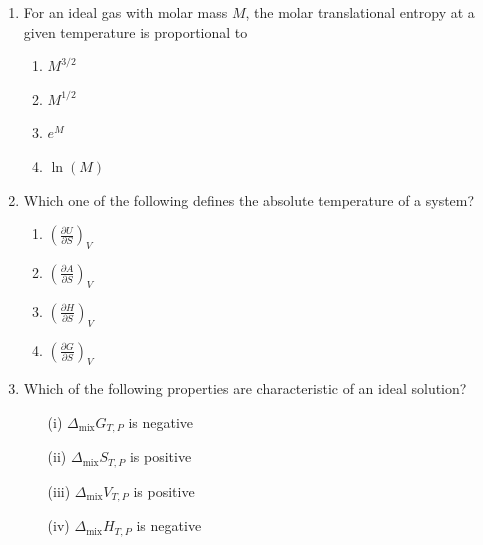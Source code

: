 \documentclass[journal,12pt,onecolumn]{exam}
\theoremstyle{remark}
\begin{document}
\begin{enumerate}
 

\item 

For an ideal gas with molar mass $M$, the molar translational entropy at a given temperature is proportional to

\hfill{}

 

\begin{multicols}{2}
\begin{enumerate}
    \item \textcolor{red}{} $M^{3/2}$
    \item \textcolor{red}{} $M^{1/2}$
    \item \textcolor{red}{} $e^M$
    \item \textcolor{green}{\checkmark} $\ln(M)$
\end{enumerate}
\end{multicols}

 

\item 

Which one of the following defines the absolute temperature of a system?

\hfill{}

 

\begin{multicols}{2}
\begin{enumerate}
    \item \textcolor{green}{\checkmark} $\left(\frac{\partial U}{\partial S}\right)_V$
    \item \textcolor{red}{} $\left(\frac{\partial A}{\partial S}\right)_V$
    \item \textcolor{red}{} $\left(\frac{\partial H}{\partial S}\right)_V$
    \item \textcolor{red}{} $\left(\frac{\partial G}{\partial S}\right)_V$
\end{enumerate}
\end{multicols}

 



\item 
Which of the following properties are characteristic of an ideal solution?

\begin{enumerate}
    \item[(i)] $\Delta_\text{mix} G_{T,P}$ is negative
    \item[(ii)] $\Delta_\text{mix} S_{T,P}$ is positive
    \item[(iii)] $\Delta_\text{mix} V_{T,P}$ is positive
    \item[(iv)] $\Delta_\text{mix} H_{T,P}$ is negative
\end{enumerate}


\end{enumerate}
\end{document}
